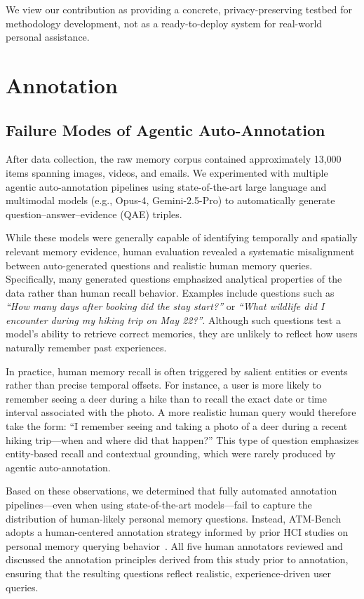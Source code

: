 \documentclass{article}
\theoremstyle{plain}
\theoremstyle{definition}
\theoremstyle{remark}
\begin{document}
We view our contribution as providing a concrete, privacy-preserving testbed for methodology development, not as a ready-to-deploy system for real-world personal assistance.

\section{Annotation}
\subsection{Failure Modes of Agentic Auto-Annotation}
\label{app:auto_annotation}

After data collection, the raw memory corpus contained approximately 13{,}000 items spanning images, videos, and emails. We experimented with multiple agentic auto-annotation pipelines using state-of-the-art large language and multimodal models (e.g., Opus-4, Gemini-2.5-Pro) to automatically generate question–answer–evidence (QAE) triples.

While these models were generally capable of identifying temporally and spatially relevant memory evidence, human evaluation revealed a systematic misalignment between auto-generated questions and realistic human memory queries. Specifically, many generated questions emphasized analytical properties of the data rather than human recall behavior. Examples include questions such as \textit{``How many days after booking did the stay start?''} or \textit{``What wildlife did I encounter during my hiking trip on May 22?''}. Although such questions test a model’s ability to retrieve correct memories, they are unlikely to reflect how users naturally remember past experiences.

In practice, human memory recall is often triggered by salient entities or events rather than precise temporal offsets. For instance, a user is more likely to remember seeing a deer during a hike than to recall the exact date or time interval associated with the photo. A more realistic human query would therefore take the form: “I remember seeing and taking a photo of a deer during a recent hiking trip—when and where did that happen?” This type of question emphasizes entity-based recall and contextual grounding, which were rarely produced by agentic auto-annotation.

Based on these observations, we determined that fully automated annotation pipelines—even when using state-of-the-art models—fail to capture the distribution of human-likely personal memory questions. Instead, ATM-Bench adopts a human-centered annotation strategy informed by prior HCI studies on personal memory querying behavior~\citep{li2025omniquery}. All five human annotators reviewed and discussed the annotation principles derived from this study prior to annotation, ensuring that the resulting questions reflect realistic, experience-driven user queries.
\end{document}
